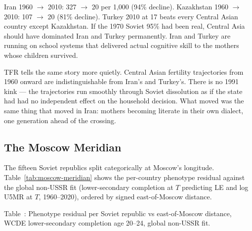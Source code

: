 \documentclass[12pt,letterpaper]{article}
\begin{document}
Iran 1960 $\to$ 2010: 327 $\to$ 20 per 1,000 (94\% decline).
Kazakhstan 1960 $\to$ 2010: 107 $\to$ 20 (81\% decline). Turkey 2010
at 17 beats every Central Asian country except Kazakhstan. If the
1970 Soviet 95\% had been real, Central Asia should have dominated
Iran and Turkey permanently. Iran and Turkey are running on
school systems that delivered actual cognitive skill to the mothers
whose children survived.

TFR tells the same story more quietly. Central Asian fertility
trajectories from 1960 onward are indistinguishable from Iran's and
Turkey's. There is no 1991 kink --- the trajectories run smoothly
through Soviet dissolution as if the state had had no independent
effect on the household decision. What moved was the same thing
that moved in Iran: mothers becoming literate in their own dialect,
one generation ahead of the crossing.

\subsection{The Moscow Meridian}\label{moscow-meridian}

The fifteen Soviet republics split categorically at Moscow's
longitude. Table~\ref{tab:moscow-meridian} shows the per-country
phenotype residual against the global non-USSR fit (lower-secondary
completion at $T$ predicting LE and log U5MR at $T$, 1960--2020),
ordered by signed east-of-Moscow distance.

\label{tab:moscow-meridian}Table~\thetable: Phenotype residual per Soviet republic vs east-of-Moscow distance, WCDE lower-secondary completion age 20--24, global non-USSR fit.
\end{document}

